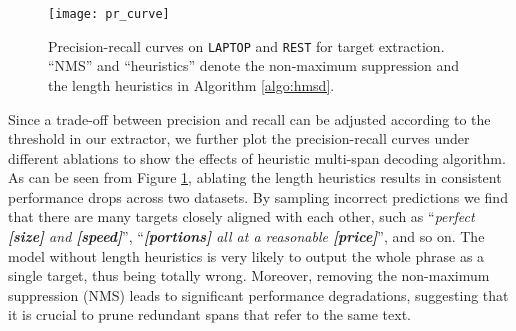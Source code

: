 \documentclass[11pt,a4paper]{article}
\begin{document}
\begin{figure}
\center
\texttt{[image: pr\_curve]}
\caption{Precision-recall curves on \texttt{LAPTOP} and \texttt{REST} for target extraction.  ``NMS'' and ``heuristics'' denote the non-maximum suppression and the length heuristics in Algorithm \ref{algo:hmsd}.}
\label{fig:pr_curve}
\end{figure}

Since a trade-off between precision and recall can be adjusted according to the threshold  in our extractor, we further plot the precision-recall curves under different ablations to show the effects of heuristic multi-span decoding algorithm.
As can be seen from Figure \ref{fig:pr_curve}, ablating the length heuristics results in consistent performance drops across two datasets.
By sampling incorrect predictions we find that there are many targets closely aligned with each other, such as ``\emph{perfect \textbf{[size]} and \textbf{[speed]}}'', ``\emph{\textbf{[portions]} all at a reasonable \textbf{[price]}}'', and so on.
The model without length heuristics is very likely to output the whole phrase as a single target, thus being totally wrong.
Moreover, removing the non-maximum suppression (NMS) leads to significant performance degradations, suggesting that it is crucial to prune redundant spans that refer to the same text.
\end{document}
